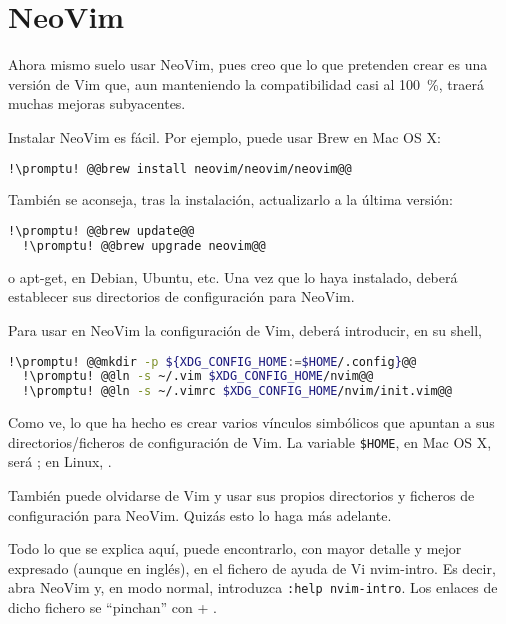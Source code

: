 \section{NeoVim}\label{sec:nvim}
Ahora mismo suelo usar NeoVim, pues creo que lo que pretenden crear es una versión de Vim que, aun manteniendo
la compatibilidad casi al \SI{100}{\percent}, traerá muchas mejoras subyacentes.

Instalar NeoVim es fácil. Por ejemplo, puede usar Brew en Mac OS X:

\begin{lstlisting}[gobble=2,language=bash,style=bashinteract,escapechar=!]
  !\promptu! @@brew install neovim/neovim/neovim@@
\end{lstlisting}

\noindent También se aconseja, tras la instalación, actualizarlo a la última versión:

\begin{lstlisting}[gobble=2,language=bash,style=bashinteract,escapechar=!]
  !\promptu! @@brew update@@
  !\promptu! @@brew upgrade neovim@@
\end{lstlisting}

\noindent o apt-get, en Debian, Ubuntu, etc. Una vez que lo haya instalado, deberá establecer sus directorios de
configuración para NeoVim.

Para usar en NeoVim la configuración de Vim, deberá introducir, en su shell,

\begin{lstlisting}[gobble=2,language=bash,style=bashinteract,escapechar=!]
  !\promptu! @@mkdir -p ${XDG_CONFIG_HOME:=$HOME/.config}@@
  !\promptu! @@ln -s ~/.vim $XDG_CONFIG_HOME/nvim@@
  !\promptu! @@ln -s ~/.vimrc $XDG_CONFIG_HOME/nvim/init.vim@@
\end{lstlisting}

\noindent Como ve, lo que ha hecho es crear varios vínculos simbólicos que apuntan a sus directorios/ficheros de
configuración de Vim. La variable \lstinline!$HOME!, en Mac OS X, será ; en Linux,
.

También puede olvidarse de Vim y usar sus propios directorios y ficheros de configuración para NeoVim. Quizás
esto lo haga más adelante.

Todo lo que se explica aquí, puede encontrarlo, con mayor detalle y mejor expresado (aunque en inglés), en el
fichero de ayuda de Vi nvim-intro. Es decir, abra NeoVim y, en modo normal, introduzca
\lstinline!:help nvim-intro!. Los enlaces de dicho fichero se ``pinchan'' con  + \tecla{]}.
